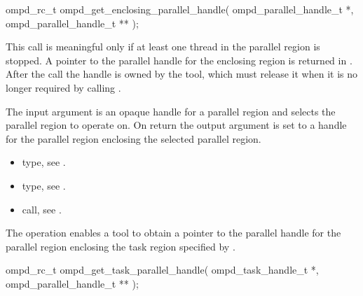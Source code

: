 \format

\begin{cspecific}
\begin{ompSyntax}
ompd_rc_t ompd_get_enclosing_parallel_handle(
  ompd_parallel_handle_t *,
  ompd_parallel_handle_t **
);
\end{ompSyntax}
\end{cspecific}


\descr
This call is meaningful only if at least one thread in the parallel region is stopped.
A pointer to the parallel handle for the enclosing region is returned in
. After the call the handle is owned by the tool, which must
release it when it is no longer required by calling .

\argdesc
The input argument  is an opaque handle for a parallel region and selects the parallel region to operate on.
On return the output argument  is set to a handle for the parallel region
enclosing the selected parallel region.

\crossreferences
\begin{itemize}
  \item {} type, see .
	\item {} type, see .
	\item {} call, see .
\end{itemize}

\label{subsubsubsec:ompd_get_task_parallel_handle}
\summary
The    operation enables a tool to obtain a
pointer to the parallel handle for the parallel region enclosing the task region specified by
.

\format

\begin{cspecific}
\begin{ompSyntax}
ompd_rc_t ompd_get_task_parallel_handle(
  ompd_task_handle_t *,
  ompd_parallel_handle_t **
);
\end{ompSyntax}
\end{cspecific}


